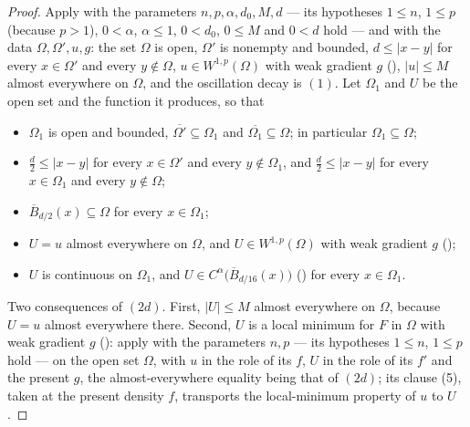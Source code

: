 \begin{proof}
Apply  with the parameters
$n,p,\alpha,d_0,M,d$ --- its hypotheses $1\le n$, $1\le p$ (because $p>1$),
$0<\alpha$, $\alpha\le1$, $0<d_0$, $0\le M$ and $0<d$ hold --- and with the
data $\Omega,\Omega',u,g$: the set $\Omega$ is open, $\Omega'$ is nonempty and
bounded, $d\le|x-y|$ for every $x\in\Omega'$ and every $y\notin\Omega$,
$u\in W^{1,p}(\Omega)$ with weak gradient $g$ (),
$|u|\le M$ almost everywhere on $\Omega$, and the oscillation decay is $(1)$.
Let $\Omega_1$ and $U$ be the open set and the function it produces, so that
\begin{itemize}
\item[(2a)] $\Omega_1$ is open and bounded,
  $\overline{\Omega'}\subseteq\Omega_1$ and
  $\overline{\Omega_1}\subseteq\Omega$; in particular
  $\Omega_1\subseteq\Omega$;
\item[(2b)] $\frac d2\le|x-y|$ for every $x\in\Omega'$ and every
  $y\notin\Omega_1$, and $\frac d2\le|x-y|$ for every $x\in\Omega_1$ and every
  $y\notin\Omega$;
\item[(2c)] $\overline B_{d/2}(x)\subseteq\Omega$ for every $x\in\Omega_1$;
\item[(2d)] $U=u$ almost everywhere on $\Omega$, and $U\in W^{1,p}(\Omega)$
  with weak gradient $g$ ();
\item[(2e)] $U$ is continuous on $\Omega_1$, and
  $U\in C^\alpha\bigl(\overline B_{d/16}(x)\bigr)$ () for
  every $x\in\Omega_1$.
\end{itemize}

Two consequences of $(2d)$.  First, $|U|\le M$ almost everywhere on $\Omega$,
because $U=u$ almost everywhere there.  Second, $U$ is a local minimum for $F$
in $\Omega$ with weak gradient $g$ (): apply
 with the parameters $n,p$ --- its hypotheses
$1\le n$, $1\le p$ hold --- on the open set $\Omega$, with $u$ in the role of
its $f$, $U$ in the role of its $f'$ and the present $g$, the
almost-everywhere equality being that of $(2d)$; its clause (5), taken at the
present density $f$, transports the local-minimum property of $u$ to $U$.


\end{proof}
